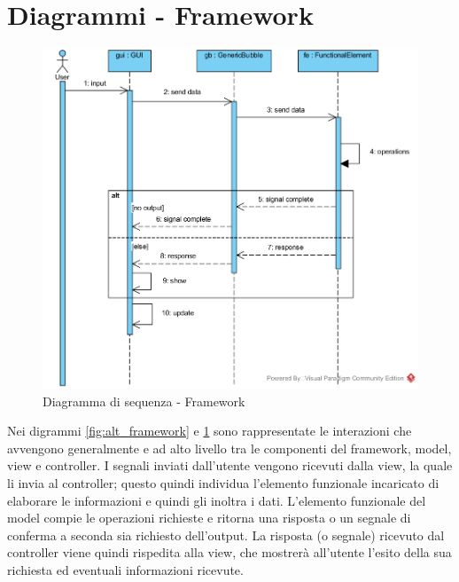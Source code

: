 \section{Diagrammi - Framework}

\begin{figure}[H]
	\centering
	\includegraphics[width=14cm]{diagrammi_img/sequenza/framework.png}
	\caption{Diagramma di sequenza - Framework}
	\label{fig:seq_framework}
\end{figure}

Nei digrammi \ref{fig:alt_framework} e \ref{fig:seq_framework} sono rappresentate le interazioni che avvengono generalmente e ad alto
livello tra le componenti del framework, model, view e controller. I segnali inviati dall’utente
vengono ricevuti dalla view, la quale li invia al controller; questo quindi individua l’elemento
funzionale incaricato di elaborare le informazioni e quindi gli inoltra i dati. L’elemento funzionale
del model compie le operazioni richieste e ritorna una risposta o un segnale di conferma a seconda
sia richiesto dell’output. La risposta (o segnale) ricevuto dal controller viene quindi rispedita
alla view, che mostrerà all’utente l’esito della sua richiesta ed eventuali informazioni ricevute.